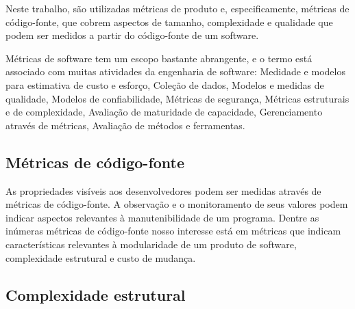 Neste trabalho, são utilizadas métricas de produto e, especificamente,
métricas de código-fonte, que cobrem aspectos de tamanho, complexidade e
qualidade que podem ser medidos a partir do código-fonte de um software.

Métricas de software tem um escopo bastante abrangente, e o termo está
associado com muitas atividades da engenharia de software: Medidade e modelos
para estimativa de custo e esforço, Coleção de dados, Modelos e medidas de
qualidade, Modelos de confiabilidade, Métricas de segurança, Métricas
estruturais e de complexidade, Avaliação de maturidade de capacidade,
Gerenciamento através de métricas, Avaliação de métodos e ferramentas.

\subsection{Métricas de código-fonte} \label{metricas-de-codigo}

As propriedades visíveis aos desenvolvedores podem ser medidas através de
métricas de código-fonte. A observação e o monitoramento de seus valores podem
indicar aspectos relevantes à manutenibilidade de um programa. Dentre as
inúmeras métricas de código-fonte nosso interesse está em métricas que indicam
características relevantes à modularidade de um produto de software,
complexidade estrutural e custo de mudança.


\subsection{Complexidade estrutural} \label{complexidade}

